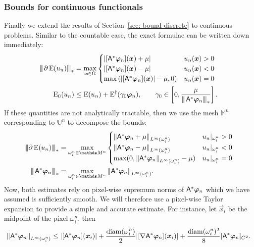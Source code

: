 \documentclass[smallextended]{svjour3}
\let\F\mathds\let\C\mathcal\newcommand{\R}{\F{R}}\newcommand{\A}{\tens{A}}
\newcommand{\norm}[1]{{\left\lVert #1 \right\rVert}}
\newcommand{\Norm}[1]{{\left\vert\kern-0.25ex\left\vert\kern-0.25ex\left\vert #1 \right\vert\kern-0.25ex\right\vert\kern-0.25ex\right\vert}}
\newcommand{\op}[1]{\operatorname{#1}}
\newcommand{\1}{\F{1}}
\newcommand{\Domain}{\Omega}\newcommand{\domain}{\omega}
\newcommand*{\var}[1]{%
	\IfEqCase{#1}{%
		{0}{u}%
		{1}{v}%
		{2}{w}%
	}[u#1]%
}
\newcommand*{\vars}[1]{%
	\IfEqCase{#1}{%
		{0}{\alpha}%
		{1}{\beta}%
		{2}{\gamma}%
		{3}{a}%
		{4}{b}%
		{5}{c}%
	}[k#1]%
}
\begin{document}
	\subsubsection{Bounds for continuous functionals}\label{sec: bound continuous}
	Finally we extend the results of Section~\ref{sec: bound discrete} to continuous problems. Similar to the countable case, the exact formulae can be written down immediately:
	\begin{align}
		\Norm{\partial\op{E}(\var0_n)}_* &= \max_{\vec{x}\in\Domain}\begin{cases}
			|[\A^*\vec{\varphi}_n](\vec{x}) + \mu| & \var0_n(\vec{x})>0
			\\|[\A^*\vec{\varphi}_n](\vec{x}) - \mu| & \var0_n(\vec{x})<0
			\\\max\left(|[\A^*\vec{\varphi}_n](\vec{x})| - \mu, 0\right) & \var0_n(\vec{x}) = 0
		\end{cases}
		\\ \op{E}_0(\var0_n) &\leq \op{E}(\var0_n) + \op{E}^\dag(\vars2_0\vec{\varphi}_n), \qquad \vars2_0\in\left[0,\frac{\mu}{\Norm{\A^*\vec{\varphi}_n}_*}\right].
	\end{align}
	If these quantities are not analytically tractable, then we use the mesh $\F M^n$ corresponding to $\F{U}^n$ to decompose the bounds:
	\begin{align}
		\Norm{\partial \op{E}(\var0_n)}_* &= \max_{\domain_i^n\in\F M^n} \begin{cases}
			\norm{\A^*\vec{\varphi}_n + \mu}_{L^\infty(\domain_i^n)} & \var0_n|_{\domain_i^n} > 0
			\\\norm{\A^*\vec{\varphi}_n - \mu}_{L^\infty(\domain_i^n)} & \var0_n|_{\domain_i^n} < 0
			\\\max(0, \norm{\A^*\vec{\varphi}_n}_{L^\infty(\domain_i^n)}-\mu) & \var0_n|_{\domain_i^n} = 0
		\end{cases}
		\\ \Norm{\A^*\vec{\varphi}_n}_* &= \max_{\domain_i^n\in\F M^n} \norm{\A^*\vec{\varphi}_n}_{L^\infty(\domain_i^n)}.
	\end{align}
	Now, both estimates rely on pixel-wise supremum norms of $\A^*\vec{\varphi}_n$ which we have assumed is sufficiently smooth. We will therefore use a pixel-wise Taylor expansion to provide a simple and accurate estimate. For instance, let $\vec{x}_i$ be the midpoint of the pixel $\domain_i^n$, then 
	\begin{equation}\label{eq: Taylor approximation}
		\norm{\A^*\vec{\varphi}_n}_{L^\infty(\domain_i^n)} \leq |[\A^*\vec{\varphi}_n](\vec{x}_i)| + \frac{\op{diam}(\domain_i^n)}{2}|[\nabla\A^*\vec{\varphi}_n](\vec{x}_i)| + \frac{\op{diam}(\domain_i^n)^2}{8}|\A^*\vec{\varphi}_n|_{C^2}.
	\end{equation}
\end{document}
